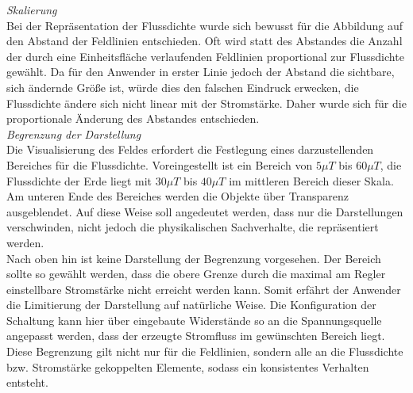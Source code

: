\textit{Skalierung}\\
Bei der Repräsentation der Flussdichte wurde sich bewusst für die Abbildung auf den Abstand der Feldlinien entschieden. Oft wird statt des Abstandes die Anzahl der durch eine Einheitsfläche verlaufenden Feldlinien proportional zur Flussdichte gewählt. Da für den Anwender in erster Linie jedoch der Abstand die sichtbare, sich ändernde Größe ist, würde dies den falschen Eindruck erwecken, die Flussdichte ändere sich nicht linear mit der Stromstärke. Daher wurde sich für die proportionale Änderung des Abstandes entschieden.\\

\textit{Begrenzung der Darstellung}\\
Die Visualisierung des Feldes erfordert die Festlegung eines darzustellenden Bereiches für die Flussdichte. Voreingestellt ist ein Bereich von $5 \mu T$ bis $60 \mu T$, die Flussdichte der Erde liegt mit $30 \mu T$ bis $40 \mu T$ im mittleren Bereich dieser Skala. Am unteren Ende des Bereiches werden die Objekte über Transparenz ausgeblendet. Auf diese Weise soll angedeutet werden, dass nur die Darstellungen verschwinden, nicht jedoch die physikalischen Sachverhalte, die repräsentiert werden.\\
\noindent\hspace*{5mm}
Nach oben hin ist keine Darstellung der Begrenzung vorgesehen. Der Bereich sollte so gewählt werden, dass die obere Grenze durch die maximal am Regler einstellbare Stromstärke nicht erreicht werden kann. Somit erfährt der Anwender die Limitierung der Darstellung auf natürliche Weise. Die Konfiguration der Schaltung kann hier über eingebaute Widerstände so an die Spannungsquelle angepasst werden, dass der erzeugte Stromfluss im gewünschten Bereich liegt. Diese Begrenzung gilt nicht nur für die Feldlinien, sondern alle an die Flussdichte bzw. Stromstärke gekoppelten Elemente, sodass ein konsistentes Verhalten entsteht.

\vspace{4px}
\begin{center}
	\\
\end{center}

